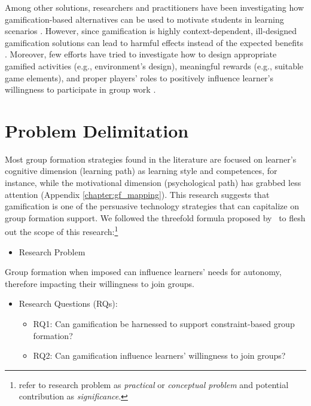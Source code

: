 Among other solutions, researchers and practitioners have been investigating how gamification-based alternatives can be used to motivate students in learning scenarios \cite{The_Gamification_of_Learning_and_Instruction,A_systematic_mapping,Does_Gamification_Work}. However, since gamification is highly context-dependent, ill-designed gamification solutions can lead to harmful effects instead of the expected benefits \cite{Demographic_differences_in_perceived_benefits,The_Bright_and_Dark_Sides_of_Gamification}. Moreover, few efforts have tried to investigate how to design appropriate gamified activities (e.g., environment’s design), meaningful rewards (e.g., suitable game elements), and proper players’ roles to positively influence learner's willingness to participate in group work \cite{A_Link_Between_Worlds}. 

\section{Problem Delimitation}
Most group formation strategies found in the literature are focused on learner's cognitive dimension (learning path) as learning style and competences, for instance, while the motivational dimension (psychological path) has grabbed less attention (Appendix \ref{chapter:gf_mapping}). 
This research suggests that gamification is one of the persuasive technology strategies that can capitalize on group formation support. We followed the threefold formula proposed by~\cite{the_craft_of_research} to flesh out the scope of this research:\footnote{
 refer to research problem as \emph{practical} or \emph{conceptual problem} and potential contribution as \emph{significance}.
}
\begin{itemize}
\item Research Problem
\end{itemize}
Group formation when imposed can influence learners' needs for autonomy, therefore impacting their willingness to join groups.

\begin{itemize}
\item Research Questions (RQs):
	\begin{itemize}
	\item RQ1: Can gamification be harnessed to support constraint-based group formation?
    \item RQ2: Can gamification influence learners' willingness to join groups?
	\end{itemize}
\end{itemize}

